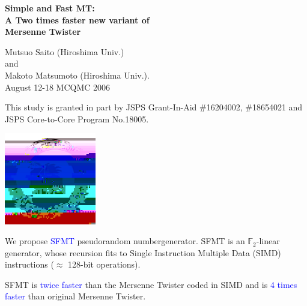 \documentclass[a4j,12pt,landscape]{jarticle}
\title{}
\author{}
\date{\today}
\def\F2{{\mathbb F}_2}
\begin{document}
\Huge

\begin{center}
{\bf Simple and Fast MT:\\
  A Two times faster new variant of \\
  Mersenne Twister}
\vspace{1cm}

Mutsuo Saito (Hiroshima Univ.) \\
and \\
Makoto Matsumoto (Hiroshima Univ.).\\
August 12-18 MCQMC 2006
\end{center}
\vspace{\fill}
\parbox{19cm}{\Large
This study is granted in part by
JSPS Grant-In-Aid \#16204002, \#18654021
and JSPS Core-to-Core Program No.18005.
}
\parbox{2cm}{\vskip 1cm \includegraphics*[width=4cm,height=4cm]{logo.jpg}}

\newpage
We propose \textcolor{blue}{SFMT} pseudorandom numbergenerator.
SFMT is an $\F2$-linear generator,
whose recursion fits to Single Instruction Multiple Data (SIMD)
instructions ($\approx$ 128-bit operations).

\vskip 5mm
SFMT is \textcolor{blue}{twice faster} than the Mersenne Twister
 coded in SIMD and is \textcolor{blue}{4 times faster} than original Mersenne Twister.






\end{document}
